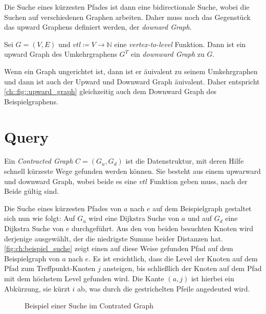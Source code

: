 Die Suche eines kürzesten Pfades ist dann eine bidirectionale Suche, wobei die Suchen auf verschiedenen Graphen arbeiten.
Daher muss noch das Gegenstück das upward Graphens definiert werden, der \emph{downard Graph}.

\begin{definition}
    Sei $G = (V, E)$ und ${vtl} \coloneq V \to \mathbb{N}$ eine \emph{vertex-to-level} Funktion. Dann ist ein upward Graph des Umkehrgraphens $G^T$ ein \emph{downward Graph} zu $G$.
\end{definition}

Wenn ein Graph ungerichtet ist, dann ist er äuivalent zu seinem Umkehrgraphen und dann ist auch der Upward und Downward Graph äuivalent.
Daher entspricht \autoref{ch::fig::upward_graph} gleichzeitig auch dem Downward Graph des Beispielgraphens.

\section{Query}

Ein \emph{Contracted Graph} $C = (G_u, G_d)$ ist die Datenstruktur, mit deren Hilfe schnell kürzeste Wege gefunden werden können.
Sie besteht aus einem upwarward und downward Graph, wobei beide es eine ${vtl}$ Funktion geben muss, nach der Beide gültig sind.

Die Suche eines kürzesten Pfades von $a$ nach $e$ auf dem Beispielgraph gestaltet sich nun wie folgt:
Auf $G_u$ wird eine Dijkstra Suche von $a$ und auf $G_d$ eine Dijkstra Suche von $e$ durchgeführt.
Aus den von beiden besuchten Knoten wird derjenige ausgewählt, der die niedrigste Summe beider Distanzen hat.
\autoref{fig:ch:beispiel_suche} zeigt einen auf diese Weise gefunden Pfad auf dem Beispielgraph von $a$ nach $e$.
Es ist ersichtlich, dass die Level der Knoten auf dem Pfad zum Treffpunkt-Knoten $j$ ansteigen, bis schließlich der Knoten auf dem Pfad mit dem höchstem Level gefunden wird.
Die Kante $(a, j)$ ist hierbei ein Abkürzung, sie kürzt $i$ ab, was durch die gestrichelten Pfeile angedeuted wird.

\begin{figure}[ht]
    \centering
    \caption{Beispiel einer Suche im Contrated Graph}
    \label{fig:ch:beispiel_suche}
\end{figure}

